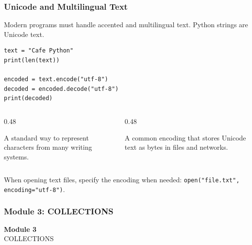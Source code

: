 \documentclass[aspectratio=169,10pt]{beamer}
\newcommand{\codeword}[1]{\texttt{#1}}
\begin{document}
\begin{frame}[fragile]
\frametitle{Unicode and Multilingual Text}
\small
Modern programs must handle accented and multilingual text. Python strings are Unicode text.

\vspace{0.15cm}
\begin{lstlisting}[style=pycode]
text = "Cafe Python"
print(len(text))

encoded = text.encode("utf-8")
decoded = encoded.decode("utf-8")
print(decoded)
\end{lstlisting}

\begin{columns}[T,totalwidth=0.96\textwidth]
\begin{column}{0.48\textwidth}
\begin{tcolorbox}[lecturebox,title=Unicode]
A standard way to represent characters from many writing systems.
\end{tcolorbox}
\end{column}
\begin{column}{0.48\textwidth}
\begin{tcolorbox}[lecturebox,title=UTF-8]
A common encoding that stores Unicode text as bytes in files and networks.
\end{tcolorbox}
\end{column}
\end{columns}

\vspace{0.15cm}
\begin{tcolorbox}[lecturebox,title=Practical habit]
When opening text files, specify the encoding when needed: \codeword{open("file.txt", encoding="utf-8")}.
\end{tcolorbox}
\end{frame}

\begin{noheadline}
\begin{frame}
\frametitle{Module 3: COLLECTIONS}
\vspace{1.2cm}
\begin{center}
  {\fontsize{30}{36}\selectfont\textbf{Module 3}}\\[0.35cm]
  {\fontsize{25}{30}\selectfont COLLECTIONS}\\[0.7cm]
\end{center}
\end{frame}
\end{noheadline}
\end{document}
